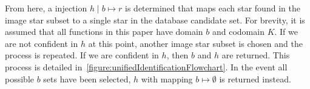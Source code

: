 \newcommand{\smapsto}{\! \mapsto \!}
From here, a injection $h \mid b \smapsto r$ is determined that maps each star found in the image
star subset to a single star in the database candidate set.
For brevity, it is assumed that all functions in this paper have domain $b$ and codomain $K$.
If we are not confident in $h$ at this point, another image star subset is chosen and the process is repeated.
If we are confident in $h$, then $b$ and $h$ are returned.
This process is detailed in~\autoref{figure:unifiedIdentificationFlowchart}.
In the event all possible $b$ sets have been selected, $h$ with mapping $b \smapsto \emptyset$ is returned instead.



